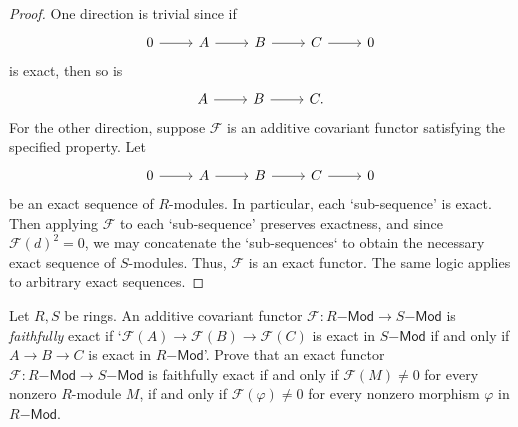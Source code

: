 \documentclass[../../master.tex]{subfiles}
\begin{document}
\begin{proof}
    One direction is trivial since if
    \[
    \begin{tikzcd}
        0 & A & B & C & 0
        \arrow[from=1-1, to=1-2]
        \arrow[from=1-2, to=1-3]
        \arrow[from=1-3, to=1-4]
        \arrow[from=1-4, to=1-5]
    \end{tikzcd}
    \]
    is exact, then so is
    \[
    \begin{tikzcd}
        A & B & C.
        \arrow[from=1-1, to=1-2]
        \arrow[from=1-2, to=1-3]
    \end{tikzcd}
    \]
    For the other direction, suppose $\mathscr{F}$ is an additive covariant functor satisfying the specified property.
    Let
    \[
    \begin{tikzcd}
        0 & A & B & C & 0
        \arrow[from=1-1, to=1-2]
        \arrow[from=1-2, to=1-3]
        \arrow[from=1-3, to=1-4]
        \arrow[from=1-4, to=1-5]
    \end{tikzcd}
    \]
    be an exact sequence of $R$-modules.
    In particular, each `sub-sequence' is exact.
    Then applying $\mathscr{F}$ to each `sub-sequence' preserves exactness, and since $\mathscr{F}(d)^2 = 0$, we may concatenate the `sub-sequences` to obtain the necessary exact sequence of $S$-modules.
    Thus, $\mathscr{F}$ is an exact functor.
    The same logic applies to arbitrary exact sequences.
\end{proof}

\begin{problem}
    Let $R, S$ be rings.
    An additive covariant functor $\mathscr{F} : R\mathsf{-Mod} \to S\mathsf{-Mod}$ is \textit{faithfully} exact if `$\mathscr{F}(A) \longrightarrow \mathscr{F}(B) \longrightarrow \mathscr{F}(C)$ is exact in $S\mathsf{-Mod}$ if and only if $A \longrightarrow B \longrightarrow C$ is exact in $R\mathsf{-Mod}$'.
    Prove that an exact functor $\mathscr{F} : R\mathsf{-Mod} \to S\mathsf{-Mod}$ is faithfully exact if and only if $\mathscr{F}(M) \neq 0$ for every nonzero $R$-module $M$, if and only if $\mathscr{F}(\varphi) \neq 0$ for every nonzero morphism $\varphi$ in $R\mathsf{-Mod}$.
\end{problem}
\end{document}
